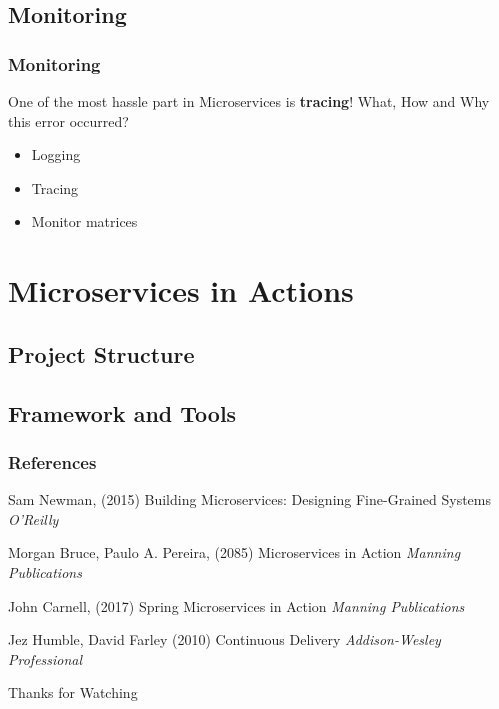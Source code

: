 \documentclass{beamer}
\begin{document}
	\subsection {Monitoring}
		\begin{frame}
			\frametitle{Monitoring}
				One of the most hassle part in Microservices is \textbf{tracing}! What, How and Why this error occurred? 
				\begin{itemize}
					\item Logging 
					\item Tracing
					\item Monitor matrices 
				\end{itemize}
			\vspace{100mm}
		\end{frame}
	
		


\section{Microservices in Actions}
	\subsection {Project Structure}
	\subsection {Framework and Tools}
	
	
\begin{frame}
\frametitle{References}
\footnotesize{
\begin{thebibliography}{99} %
 Sam Newman, (2015)
\newblock Building Microservices: Designing Fine-Grained Systems
\newblock \emph{O'Reilly}

 Morgan Bruce, Paulo A. Pereira, (2085)
\newblock Microservices in Action
\newblock \emph{Manning Publications}

 John Carnell, (2017)
\newblock Spring Microservices in Action
\newblock \emph{Manning Publications}

 Jez Humble, David Farley (2010)
\newblock Continuous Delivery
\newblock \emph{Addison-Wesley Professional}
\end{thebibliography}
}
\end{frame}


\begin{frame}
\Huge{\centerline{Thanks for Watching}}
\end{frame}

\end{document}
